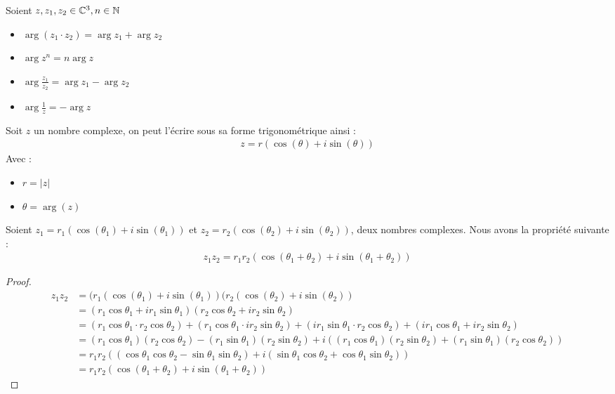     \begin{proposition}
    Soient $z, z_1, z_2 \in \mathbb{C}^3, n \in \mathbb{N}$
    \begin{itemize}
        \item $\arg{(z_1 \cdot z_2)} = \arg{z_1} + \arg{z_2}$
        \item $\arg{z^n} = n\arg{z}$
        \item $\arg{\frac{z_1}{z_2}} = \arg{z_1} - \arg{z_2}$
        \item $\arg{\frac{1}{z}} = -\arg{z}$
    \end{itemize}
\end{proposition}


    \begin{definition}
    Soit $z$ un nombre complexe, on peut l'écrire sous sa forme trigonométrique ainsi :
    \begin{align*}
        z = r (\cos{(\theta)} + i \sin{(\theta)}) 
    \end{align*}
    Avec :
    \begin{itemize}
        \item $r = |z|$
        \item $\theta = \arg{(z)}$
    \end{itemize}
\end{definition}


\begin{proposition}{}
    Soient $z_1 = r_1(\cos{(\theta_1)} + i \sin{(\theta_1)})$ et $z_2 = r_2(\cos{(\theta_2)} + i\sin{(\theta_2)})$, deux nombres complexes. Nous avons la propriété suivante :
    \begin{align*}
        z_1 z_2 = r_1r_2(\cos{(\theta_1 + \theta_2)} + i\sin{(\theta_1 + \theta_2)})
    \end{align*}

\end{proposition}
\begin{proof}
        \begin{align*}
            z_1 z_2 &= (r_1(\cos{(\theta_1)} + i \sin{(\theta_1)}) (r_2(\cos{(\theta_2)}+i \sin{(\theta_2)}) \\
                    &=(r_1\cos{\theta_1} + ir_1 \sin{\theta_1}) (r_2\cos{\theta_2} + ir_2 \sin{\theta_2}) \\
                    &= (r_1\cos{\theta_1} \cdot r_2\cos{\theta_2}) + (r_1\cos{\theta_1} \cdot ir_2\sin{\theta_2}) + (ir_1\sin{\theta_1} \cdot r_2\cos{\theta_2}) + (ir_1\cos{\theta_1} + ir_2\sin{\theta_2})  \\
                    &= (r_1\cos{\theta_1})(r_2\cos{\theta_2}) - (r_1\sin{\theta_1})(r_2\sin{\theta_2}) + i((r_1\cos{\theta_1})(r_2\sin{\theta_2}) + (r_1\sin{\theta_1})(r_2\cos{\theta_2})) \\
                    &= r_1r_2((\cos{\theta_1} \cos{\theta_2} - \sin{\theta_1} \sin{\theta_2}) + i(\sin{\theta_1}\cos{\theta_2} + \cos{\theta_1}\sin{\theta_2})) \\
                    &= r_1r_2(\cos{(\theta_1 + \theta_2)} + i\sin{(\theta_1 + \theta_2)})
        \end{align*}
    \end{proof}

